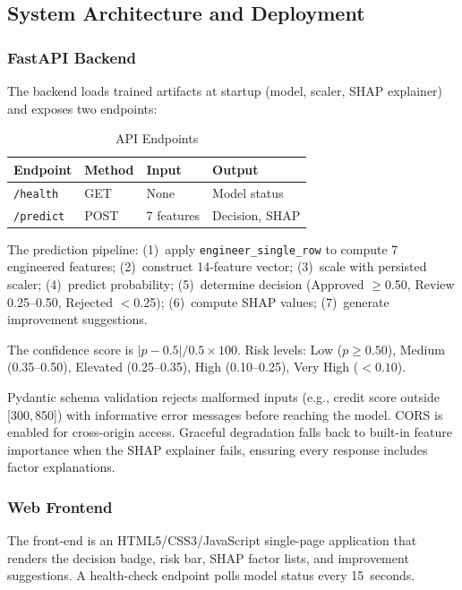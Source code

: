 \documentclass[journal]{IEEEtran}
\begin{document}
\subsection{System Architecture and Deployment}

\subsubsection{FastAPI Backend}
The backend loads trained artifacts at startup (model, scaler, SHAP explainer) and exposes two endpoints:

\begin{table}[!t]
\centering
\caption{API Endpoints}
\label{tab:api_endpoints}
\begin{tabular}{lllp{2.4cm}}
\toprule
\textbf{Endpoint} & \textbf{Method} & \textbf{Input} & \textbf{Output} \\
\midrule
\texttt{/health} & GET & None & Model status \\
\texttt{/predict} & POST & 7 features & Decision, SHAP \\
\bottomrule
\end{tabular}
\end{table}

The prediction pipeline: (1)~apply \texttt{engineer\_single\_row} to compute 7 engineered features; (2)~construct 14-feature vector; (3)~scale with persisted scaler; (4)~predict probability; (5)~determine decision (Approved $\geq$0.50, Review 0.25--0.50, Rejected $<$0.25); (6)~compute SHAP values; (7)~generate improvement suggestions.

The confidence score is $|p - 0.5|/0.5 \times 100$. Risk levels: Low ($p \geq 0.50$), Medium (0.35--0.50), Elevated (0.25--0.35), High (0.10--0.25), Very High ($< 0.10$).

Pydantic schema validation rejects malformed inputs (e.g., credit score outside [300,\,850]) with informative error messages before reaching the model. CORS is enabled for cross-origin access. Graceful degradation falls back to built-in feature importance when the SHAP explainer fails, ensuring every response includes factor explanations.

\subsubsection{Web Frontend}
The front-end is an HTML5/CSS3/JavaScript single-page application that renders the decision badge, risk bar, SHAP factor lists, and improvement suggestions. A health-check endpoint polls model status every 15~seconds.
\end{document}
